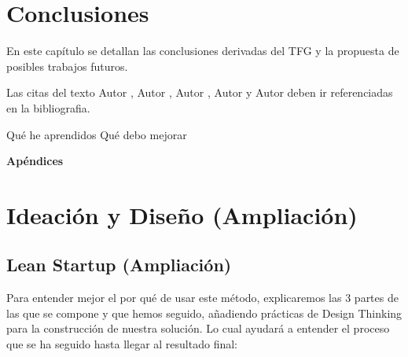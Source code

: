 \documentclass[12pt,twoside,titlepage]{report}
\newcommand\blankpage{%
    \newpage
    \null
    \thispagestyle{empty}%
    \newpage}
\begin{document}
\newpage

\chapter{Conclusiones}

En este capítulo se detallan las conclusiones derivadas del TFG y la propuesta de posibles trabajos futuros.

Las citas del texto Autor \cite{giaquinta}, Autor \cite{fortune}, Autor \cite{fortuneB}, Autor \cite{mitchell} y Autor \cite{morrey} deben ir referenciadas en la bibliografia.


Qué he aprendidos
Qué debo mejorar

\blankpage




{}
\footnotesize{
%


}
\raggedbottom
\afterpage{\blankpage}
\newpage



\appendix
{}
{}
\mbox{}
\vfill
\begin{center}
\begin{Huge}
\textbf{Apéndices}
\end{Huge}
\end{center}
\vfill
\mbox{}
\thispagestyle{empty}
\newpage
\mbox{}
\thispagestyle{empty}
\newpage

\chapter{Ideación y Diseño (Ampliación)}

\section{Lean Startup (Ampliación)}
\label{sec:apendice}

Para entender mejor el por qué de usar este método, explicaremos las 3 partes de las que se compone y que hemos seguido, añadiendo prácticas de Design Thinking para la construcción de nuestra solución. Lo cual ayudará a entender el proceso que se ha seguido hasta llegar al resultado final:
\end{document}
